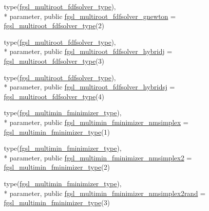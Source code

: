 \begin{DoxyCompactItemize}
\item 
type(\hyperlink{structfgsl_1_1fgsl__multiroot__fdfsolver__type}{fgsl\-\_\-multiroot\-\_\-fdfsolver\-\_\-type}), \\*
parameter, public \hyperlink{classfgsl_a4ecb43f393dacc9cefa731f8aec97f40}{fgsl\-\_\-multiroot\-\_\-fdfsolver\-\_\-gnewton} = \hyperlink{structfgsl_1_1fgsl__multiroot__fdfsolver__type}{fgsl\-\_\-multiroot\-\_\-fdfsolver\-\_\-type}(2)
\item 
type(\hyperlink{structfgsl_1_1fgsl__multiroot__fdfsolver__type}{fgsl\-\_\-multiroot\-\_\-fdfsolver\-\_\-type}), \\*
parameter, public \hyperlink{classfgsl_a3a3728bb3d1d1a699c08a4a02af2eac1}{fgsl\-\_\-multiroot\-\_\-fdfsolver\-\_\-hybridj} = \hyperlink{structfgsl_1_1fgsl__multiroot__fdfsolver__type}{fgsl\-\_\-multiroot\-\_\-fdfsolver\-\_\-type}(3)
\item 
type(\hyperlink{structfgsl_1_1fgsl__multiroot__fdfsolver__type}{fgsl\-\_\-multiroot\-\_\-fdfsolver\-\_\-type}), \\*
parameter, public \hyperlink{classfgsl_a4d6c0533915b025bbb86fb16727964ca}{fgsl\-\_\-multiroot\-\_\-fdfsolver\-\_\-hybridsj} = \hyperlink{structfgsl_1_1fgsl__multiroot__fdfsolver__type}{fgsl\-\_\-multiroot\-\_\-fdfsolver\-\_\-type}(4)
\item 
type(\hyperlink{structfgsl_1_1fgsl__multimin__fminimizer__type}{fgsl\-\_\-multimin\-\_\-fminimizer\-\_\-type}), \\*
parameter, public \hyperlink{classfgsl_ab2e841755e0db0b740c913a9ca231417}{fgsl\-\_\-multimin\-\_\-fminimizer\-\_\-nmsimplex} = \hyperlink{structfgsl_1_1fgsl__multimin__fminimizer__type}{fgsl\-\_\-multimin\-\_\-fminimizer\-\_\-type}(1)
\item 
type(\hyperlink{structfgsl_1_1fgsl__multimin__fminimizer__type}{fgsl\-\_\-multimin\-\_\-fminimizer\-\_\-type}), \\*
parameter, public \hyperlink{classfgsl_a360e9e8ff70d499aedd5dbbdbdfd8404}{fgsl\-\_\-multimin\-\_\-fminimizer\-\_\-nmsimplex2} = \hyperlink{structfgsl_1_1fgsl__multimin__fminimizer__type}{fgsl\-\_\-multimin\-\_\-fminimizer\-\_\-type}(2)
\item 
type(\hyperlink{structfgsl_1_1fgsl__multimin__fminimizer__type}{fgsl\-\_\-multimin\-\_\-fminimizer\-\_\-type}), \\*
parameter, public \hyperlink{classfgsl_a1d64d873582c83a3e43c44d10ada296e}{fgsl\-\_\-multimin\-\_\-fminimizer\-\_\-nmsimplex2rand} = \hyperlink{structfgsl_1_1fgsl__multimin__fminimizer__type}{fgsl\-\_\-multimin\-\_\-fminimizer\-\_\-type}(3)

\end{DoxyCompactItemize}
